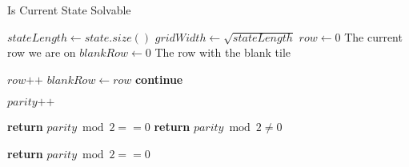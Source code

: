 \documentclass[progress]{cmpreport}
\begin{document}
	\begin{algorithm}
		\caption{Is Current State Solvable}\label{Solvable}
		\begin{algorithmic}[1]
					\State $stateLength \gets state.size()$
					\State 	$gridWidth \gets \sqrt{stateLength}$
					\State $row \gets 0$ \Comment The current row we are on
					\State $blankRow \gets 0$ \Comment The row with the blank tile
					
							\State $row\texttt{++}$	
						\EndIf	
							\State	$blankRow \gets row$
							\State \textbf{continue}
						\EndIf
						
								\State $parity\texttt{++}$	
							
							\EndIf
						\EndFor
					\EndFor
					
							\State \textbf{return} $parity \bmod 2 == 0$
						\Else
							\State \textbf{return} $parity \bmod 2 \not= 0$
						\EndIf
						
					\Else 
						\State \textbf{return} $parity \bmod 2 == 0$
					\EndIf
				\EndProcedure
		\end{algorithmic}	
	\end{algorithm}	




	
	
	
\end{document}
